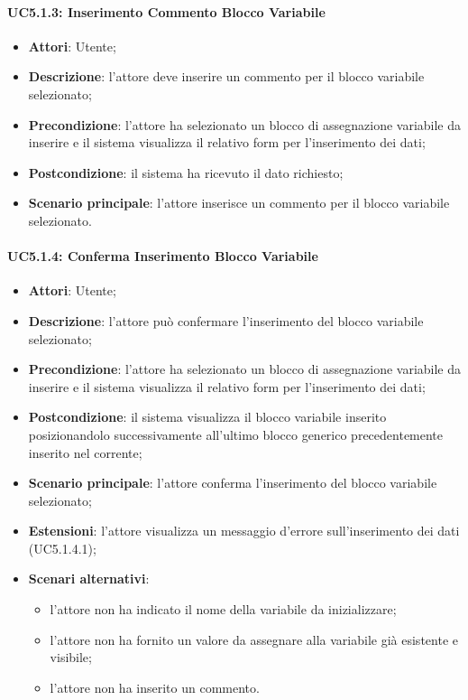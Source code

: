 \paragraph{UC5.1.3: Inserimento Commento Blocco Variabile}
\label{UC5.1.3}
\begin{itemize}
	\item \textbf{Attori}: Utente;
	\item \textbf{Descrizione}: l'attore deve inserire un commento per il blocco variabile selezionato;
	\item \textbf{Precondizione}: l'attore ha selezionato un blocco di assegnazione variabile da inserire e il sistema visualizza il relativo form per l'inserimento dei dati;
	\item \textbf{Postcondizione}: il sistema ha ricevuto il dato richiesto;
	\item \textbf{Scenario principale}: l'attore inserisce un commento per il blocco variabile selezionato.
\end{itemize}

\paragraph{UC5.1.4: Conferma Inserimento Blocco Variabile}
\label{UC5.1.4}
\begin{itemize}
	\item \textbf{Attori}: Utente;
	\item \textbf{Descrizione}: l'attore può confermare l'inserimento del blocco variabile selezionato;
	\item \textbf{Precondizione}: l'attore ha selezionato un blocco di assegnazione variabile da inserire e il sistema visualizza il relativo form per l'inserimento dei dati;
	\item \textbf{Postcondizione}: il sistema visualizza il blocco variabile inserito posizionandolo successivamente all'ultimo blocco generico precedentemente inserito nel  corrente;
	\item \textbf{Scenario principale}: l'attore conferma l'inserimento del blocco variabile selezionato;
	\item \textbf{Estensioni}: l'attore visualizza un messaggio d'errore sull'inserimento dei dati (UC5.1.4.1);
	\item \textbf{Scenari alternativi}:
	\begin{itemize}
		\item l'attore non ha indicato il nome della variabile da inizializzare;
		\item l'attore non ha fornito un valore da assegnare alla variabile già esistente e visibile;
		\item l'attore non ha inserito un commento.
	\end{itemize}
\end{itemize}

